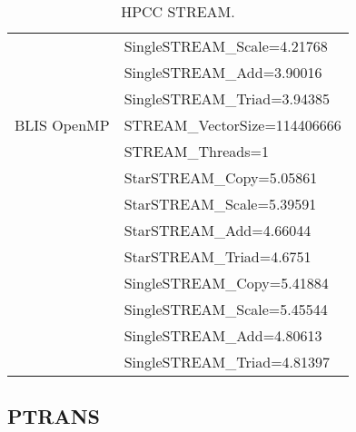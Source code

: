 \begin{table}[H]
\begin{center}
\begin{tabular}{ |l|l| }
                & SingleSTREAM\_Scale=4.21768 \\
                & SingleSTREAM\_Add=3.90016 \\
                & SingleSTREAM\_Triad=3.94385 \\
\hline
BLIS OpenMP     & STREAM\_VectorSize=114406666 \\
                & STREAM\_Threads=1 \\
                & StarSTREAM\_Copy=5.05861 \\
                & StarSTREAM\_Scale=5.39591 \\
                & StarSTREAM\_Add=4.66044 \\
                & StarSTREAM\_Triad=4.6751 \\
                & SingleSTREAM\_Copy=5.41884 \\
                & SingleSTREAM\_Scale=5.45544 \\
                & SingleSTREAM\_Add=4.80613 \\
                & SingleSTREAM\_Triad=4.81397 \\
\hline
\end{tabular}
\end{center}
\caption{\label{tab:table-name}HPCC STREAM.}
\end{table}


%
%
\subsection{PTRANS}

